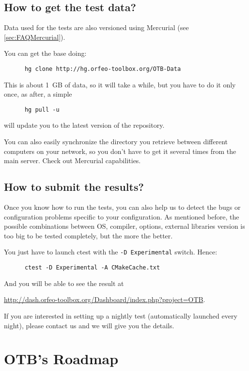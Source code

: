 \subsection{How to get the test data?}\label{sec:FAQTestData}

Data used for the tests are also versioned using Mercurial (see \ref{sec:FAQMercurial}).

You can get the base doing:
\begin{verbatim}
      hg clone http://hg.orfeo-toolbox.org/OTB-Data
\end{verbatim}

This is about 1~GB of data, so it will take a while, but you have to do it only once, as after, a simple
\begin{verbatim}
      hg pull -u
\end{verbatim}
will update you to the latest version of the repository.

You can also easily synchronize the directory you retrieve between different computers on your network, so you don't have to get it several times from the main server. Check out Mercurial capabilities.

\subsection{How to submit the results?}

Once you know how to run the tests, you can also help us to detect the bugs or configuration problems specific to your configuration. As mentioned before, the possible combinations between OS, compiler, options, external libraries version is too big to be tested completely, but the more the better.

You just have to launch ctest with the \texttt{-D Experimental} switch. Hence:
\begin{verbatim}
      ctest -D Experimental -A CMakeCache.txt
\end{verbatim}

And you will be able to see the result at

\url{http://dash.orfeo-toolbox.org/Dashboard/index.php?project=OTB}.

If you are interested in setting up a nightly test (automatically launched every night), please contact us and we will give you the details.

\section{OTB's Roadmap}

